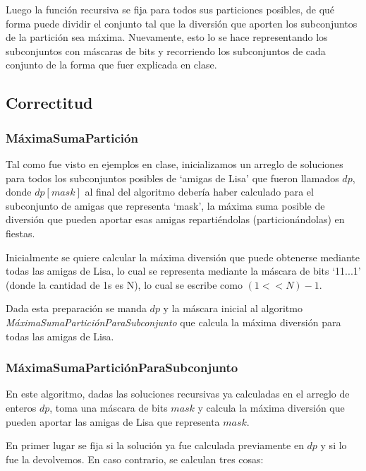 Luego la función recursiva se fija para todos sus particiones
posibles, de qué forma puede dividir el conjunto tal que la diversión que
aporten los subconjuntos de la partición sea máxima. Nuevamente, esto lo se hace
representando los subconjuntos con máscaras de bits y recorriendo los
subconjuntos de cada conjunto de la forma que fuer explicada en clase.

\subsection{Correctitud}

\subsubsection*{MáximaSumaPartición}
Tal como fue visto en ejemplos en clase, inicializamos un arreglo de soluciones
para todos los subconjuntos posibles de `amigas de Lisa' que fueron llamados
$dp$, donde $dp[mask]$ al final del algoritmo debería haber calculado para el
subconjunto de amigas que representa `mask', la máxima suma posible de diversión
que pueden aportar esas amigas repartiéndolas (particionándolas) en fiestas.

Inicialmente se quiere calcular la máxima diversión que puede obtenerse mediante
todas las amigas de Lisa, lo cual se representa mediante la máscara de bits
`11...1' (donde la cantidad de 1s es N), lo cual se escribe como $(1<<N)-1$.

Dada esta preparación se manda $dp$ y la máscara inicial al algoritmo
\emph{MáximaSumaParticiónParaSubconjunto} que calcula la máxima diversión para
todas las amigas de Lisa.

\subsubsection*{MáximaSumaParticiónParaSubconjunto}

En este algoritmo, dadas las soluciones recursivas ya calculadas en el arreglo
de enteros $dp$, toma una máscara de bits $mask$ y calcula la máxima diversión
que pueden aportar las amigas de Lisa que representa $mask$.

En primer lugar se fija si la solución ya fue calculada previamente en $dp$
y si lo fue la devolvemos. En caso contrario, se calculan tres cosas:

